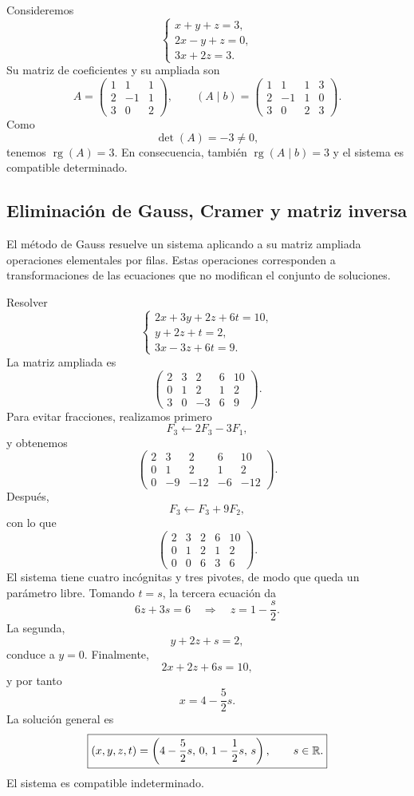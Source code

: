 \begin{example}
Consideremos
\[
\begin{cases}
x+y+z=3,\\
2x-y+z=0,\\
3x+2z=3.
\end{cases}
\]
Su matriz de coeficientes y su ampliada son
\[
A=\begin{pmatrix}
1&1&1\\
2&-1&1\\
3&0&2
\end{pmatrix},
\qquad
(A\mid b)=
\left(
\begin{array}{ccc|c}
1&1&1&3\\
2&-1&1&0\\
3&0&2&3
\end{array}
\right).
\]
Como
\[
\det(A)=-3\neq0,
\]
tenemos $\operatorname{rg}(A)=3$. En consecuencia, también $\operatorname{rg}(A\mid b)=3$ y el sistema es compatible determinado.
\end{example}

\subsection{Eliminación de Gauss, Cramer y matriz inversa}

El método de Gauss resuelve un sistema aplicando a su matriz ampliada operaciones elementales por filas. Estas operaciones corresponden a transformaciones de las ecuaciones que no modifican el conjunto de soluciones.

\begin{example}
Resolver
\[
\begin{cases}
2x+3y+2z+6t=10,\\
y+2z+t=2,\\
3x-3z+6t=9.
\end{cases}
\]
La matriz ampliada es
\[
\left(
\begin{array}{cccc|c}
2&3&2&6&10\\
0&1&2&1&2\\
3&0&-3&6&9
\end{array}
\right).
\]
Para evitar fracciones, realizamos primero
\[
F_3\leftarrow2F_3-3F_1,
\]
y obtenemos
\[
\left(
\begin{array}{cccc|c}
2&3&2&6&10\\
0&1&2&1&2\\
0&-9&-12&-6&-12
\end{array}
\right).
\]
Después,
\[
F_3\leftarrow F_3+9F_2,
\]
con lo que
\[
\left(
\begin{array}{cccc|c}
2&3&2&6&10\\
0&1&2&1&2\\
0&0&6&3&6
\end{array}
\right).
\]
El sistema tiene cuatro incógnitas y tres pivotes, de modo que queda un parámetro libre. Tomando $t=s$, la tercera ecuación da
\[
6z+3s=6
\quad\Longrightarrow\quad
z=1-\frac{s}{2}.
\]
La segunda,
\[
y+2z+s=2,
\]
conduce a $y=0$. Finalmente,
\[
2x+2z+6s=10,
\]
y por tanto
\[
x=4-\frac52s.
\]
La solución general es
\[
\boxed{(x,y,z,t)=\left(4-\frac52s,\,0,\,1-\frac12s,\,s\right),\qquad s\in\mathbb{R}.}
\]
El sistema es compatible indeterminado.
\end{example}

